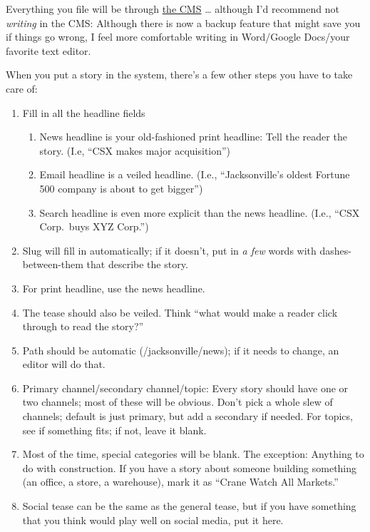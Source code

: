 \documentclass[
  11pt,
  american,
  letterpaperpaper,
  extrafontsizes,onecolumn,openright
  ]{memoir}
\providecommand{\tightlist}{%
  \setlength{\itemsep}{0pt}\setlength{\parskip}{0pt}}
\begin{document}
Everything you file will be through \href{https://cms.bizj.us/}{the CMS} \ldots{} although I'd recommend not \emph{writing} in the CMS: Although there is now a backup feature that might save you if things go wrong, I feel more comfortable writing in Word/Google Docs/your favorite text editor.

When you put a story in the system, there's a few other steps you have to take care of:

\begin{enumerate}
\def\labelenumi{\arabic{enumi}.}
\tightlist
\item
  Fill in all the headline fields

  \begin{enumerate}
  \def\labelenumii{\arabic{enumii}.}
  \tightlist
  \item
    News headline is your old-fashioned print headline: Tell the reader the story. (I.e, \enquote{CSX makes major acquisition})
  \item
    Email headline is a veiled headline. (I.e., \enquote{Jacksonville's oldest Fortune 500 company is about to get bigger})
  \item
    Search headline is even more explicit than the news headline. (I.e., \enquote{CSX Corp.~buys XYZ Corp.})
  \end{enumerate}
\item
  Slug will fill in automatically; if it doesn't, put in \emph{a few} words with dashes-between-them that describe the story.
\item
  For print headline, use the news headline.
\item
  The tease should also be veiled. Think \enquote{what would make a reader click through to read the story?}
\item
  Path should be automatic (/jacksonville/news); if it needs to change, an editor will do that.
\item
  Primary channel/secondary channel/topic: Every story should have one or two channels; most of these will be obvious. Don't pick a whole slew of channels; default is just primary, but add a secondary if needed. For topics, see if something fits; if not, leave it blank.
\item
  Most of the time, special categories will be blank. The exception: Anything to do with construction. If you have a story about someone building something (an office, a store, a warehouse), mark it as \enquote{Crane Watch All Markets.}
\item
  Social tease can be the same as the general tease, but if you have something that you think would play well on social media, put it here.
\end{enumerate}
\end{document}

